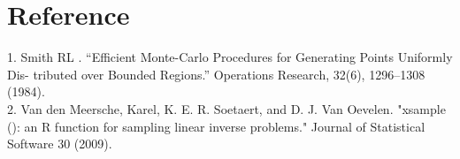 \documentclass[11 pt, a4paper]{article}  %
\begin{document}
\newpage
\section*{Reference}
1. Smith RL . “Efficient Monte-Carlo Procedures for Generating Points Uniformly Dis- tributed over Bounded Regions.” Operations Research, 32(6), 1296–1308 (1984).\\ 
2. Van den Meersche, Karel, K. E. R. Soetaert, and D. J. Van Oevelen. "xsample (): an R function for sampling linear inverse problems." Journal of Statistical Software 30 (2009).
\end{document}

